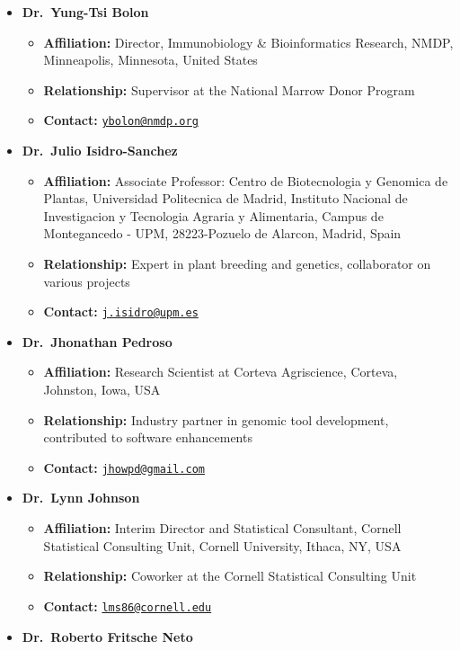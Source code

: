 \documentclass[11pt,a4paper,]{moderncv}
\providecommand{\tightlist}{%
	\setlength{\itemsep}{0pt}\setlength{\parskip}{0pt}}
\begin{document}
\begin{itemize}
\tightlist
\item
  \textbf{Dr.~Yung-Tsi Bolon}

  \begin{itemize}
  \tightlist
  \item
    \textbf{Affiliation:} Director, Immunobiology \& Bioinformatics
    Research, NMDP, Minneapolis, Minnesota, United States
  \item
    \textbf{Relationship:} Supervisor at the National Marrow Donor
    Program
  \item
    \textbf{Contact:}
    \href{mailto:ybolon@nmdp.org}{\nolinkurl{ybolon@nmdp.org}}
  \end{itemize}
\item
  \textbf{Dr.~Julio Isidro-Sanchez}

  \begin{itemize}
  \tightlist
  \item
    \textbf{Affiliation:} Associate Professor: Centro de Biotecnologia y
    Genomica de Plantas, Universidad Politecnica de Madrid, Instituto
    Nacional de Investigacion y Tecnologia Agraria y Alimentaria, Campus
    de Montegancedo - UPM, 28223-Pozuelo de Alarcon, Madrid, Spain
  \item
    \textbf{Relationship:} Expert in plant breeding and genetics,
    collaborator on various projects
  \item
    \textbf{Contact:}
    \href{mailto:j.isidro@upm.es}{\nolinkurl{j.isidro@upm.es}}
  \end{itemize}
\item
  \textbf{Dr.~Jhonathan Pedroso}

  \begin{itemize}
  \tightlist
  \item
    \textbf{Affiliation:} Research Scientist at Corteva Agriscience,
    Corteva, Johnston, Iowa, USA
  \item
    \textbf{Relationship:} Industry partner in genomic tool development,
    contributed to software enhancements
  \item
    \textbf{Contact:}
    \href{mailto:jhowpd@gmail.com}{\nolinkurl{jhowpd@gmail.com}}
  \end{itemize}
\item
  \textbf{Dr.~Lynn Johnson}

  \begin{itemize}
  \tightlist
  \item
    \textbf{Affiliation:} Interim Director and Statistical Consultant,
    Cornell Statistical Consulting Unit, Cornell University, Ithaca, NY,
    USA
  \item
    \textbf{Relationship:} Coworker at the Cornell Statistical
    Consulting Unit
  \item
    \textbf{Contact:}
    \href{mailto:lms86@cornell.edu}{\nolinkurl{lms86@cornell.edu}}
  \end{itemize}
\item
  \textbf{Dr.~Roberto Fritsche Neto}


\end{itemize}
\end{document}
